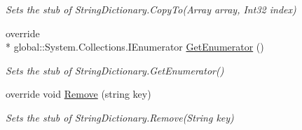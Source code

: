 \begin{DoxyCompactItemize}
\begin{DoxyCompactList}\small\item\em Sets the stub of String\-Dictionary.\-Copy\-To(\-Array array, Int32 index)\end{DoxyCompactList}\item 
override \\*
global\-::\-System.\-Collections.\-I\-Enumerator \hyperlink{class_system_1_1_collections_1_1_specialized_1_1_fakes_1_1_stub_string_dictionary_a07e0d65a767c1f14171aaf4bcc0947e2}{Get\-Enumerator} ()
\begin{DoxyCompactList}\small\item\em Sets the stub of String\-Dictionary.\-Get\-Enumerator()\end{DoxyCompactList}\item 
override void \hyperlink{class_system_1_1_collections_1_1_specialized_1_1_fakes_1_1_stub_string_dictionary_ac22c8f6f2e9787e88c3a3a44445b478f}{Remove} (string key)
\begin{DoxyCompactList}\small\item\em Sets the stub of String\-Dictionary.\-Remove(\-String key)\end{DoxyCompactList}\end{DoxyCompactItemize}
